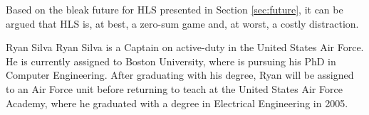 \documentclass[12pt,journal,compsoc,onecolumn]{IEEEtran}
\begin{document}
Based on the bleak future for HLS presented in Section \ref{sec:future}, it can be argued that HLS is, at best, a zero-sum game and, at worst, a costly distraction.




\begin{IEEEbiography}{Ryan Silva}
	Ryan Silva is a Captain on active-duty in the United States Air Force. He is currently assigned to Boston University, where is pursuing his PhD in Computer Engineering. After graduating with his degree, Ryan will be assigned to an Air Force unit before returning to teach at the United States Air Force Academy, where he graduated with a degree in Electrical Engineering in 2005.
\end{IEEEbiography}
\end{document}
